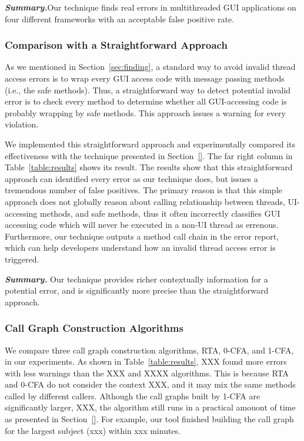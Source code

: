 \vspace{1mm}

\noindent \textbf{\textit{Summary.}}Our technique finds real errors
in multithreaded GUI applications on four different frameworks with
an acceptable false positive rate.

\subsubsection{Comparison with a Straightforward Approach}
\label{sec:straightforward}

As we mentioned in Section~\ref{sec:finding}, a standard way to avoid
invalid thread access errors is to wrap every GUI access code
with message passing methods (i.e., the safe methods). Thus, a
straightforward way to detect potential invalid error
is to check every method to determine whether all GUI-accessing code
is probably wrapping by safe methods. This approach
issues a warning for every violation. 

We implemented this straightforward approach and experimentally compared its
effectiveness with the technique presented in Section~\ref{}.
The far right column in Table~\ref{table:results} shows its result.
The results show that this straightforward approach can identified every
error as our technique does, but issues a tremendous number of false
positives. The primary reason is that this simple approach
does not globally reason about calling relationship between
threads, UI-accessing methods, and safe methods, thus it often incorrectly
classifies GUI accessing code which will never be executed
in a non-UI thread as errenous. Furthermore, our technique
outputs a method call chain in the error report, which can help
developers understand how an invalid thread access error is triggered.


\vspace{1mm}

\noindent \textbf{\textit{Summary.}} Our technique provides
richer contextually information for a potential error, and 
is significantly more precise than the straightforward approach.

\subsubsection{Call Graph Construction Algorithms}
\label{sec:reflectionaware}

We compare three call graph construction algorithms, RTA, 0-CFA, and 1-CFA,
in our experiments. As shown in Table~\ref{table:results},  XXX found
more errors with less warnings than the XXX and XXXX algorithms. This
is because RTA and 0-CFA do not consider the context XXX, and it may
mix the same methods called by different callers. Although the call graphs
built by 1-CFA are significantly larger, XXX, the algorithm still runs
in a practical amouont of time as presented in Section~\ref{}. For example,
our tool finished building the call graph for the largest subject (xxx)
within xxx minutes.

